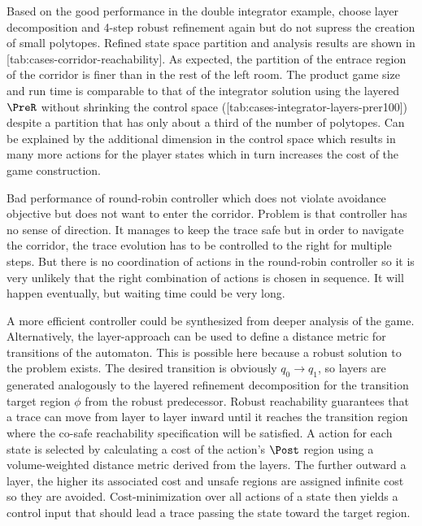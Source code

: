     Based on the good performance in the double integrator example, choose layer decomposition and 4-step robust refinement again but do not supress the creation of small polytopes.
    Refined state space partition and analysis results are shown in [tab:cases-corridor-reachability].
    As expected, the partition of the entrace region of the corridor is finer than in the rest of the left room.
    The product game size and run time is comparable to that of the integrator solution using the layered $\PreR$ without shrinking the control space ([tab:cases-integrator-layers-prer100]) despite a partition that has only about a third of the number of polytopes.
    Can be explained by the additional dimension in the control space which results in many more actions for the player states which in turn increases the cost of the game construction.

\stopsubsection


\startsubsection[title={Reachability Controller}]


    Bad performance of round-robin controller which does not violate avoidance objective but does not want to enter the corridor.
    Problem is that controller has no sense of direction.
    It manages to keep the trace safe but in order to navigate the corridor, the trace evolution has to be controlled to the right for multiple steps.
    But there is no coordination of actions in the round-robin controller so it is very unlikely that the right combination of actions is chosen in sequence.
    It will happen eventually, but waiting time could be very long.

    A more efficient controller could be synthesized from deeper analysis of the game.
    Alternatively, the layer-approach can be used to define a distance metric for transitions of the automaton.
    This is possible here because a robust solution to the problem exists.
    The desired transition is obviously $q_0 \rightarrow q_1$, so layers are generated analogously to the layered refinement decomposition for the transition target region $\phi$ from the robust predecessor.
    Robust reachability guarantees that a trace can move from layer to layer inward until it reaches the transition region where the co-safe reachability specification will be satisfied.
    A action for each state is selected by calculating a cost of the action's $\Post$ region using a volume-weighted distance metric derived from the layers.
    The further outward a layer, the higher its associated cost and unsafe regions are assigned infinite cost so they are avoided.
    Cost-minimization over all actions of a state then yields a control input that should lead a trace passing the state toward the target region.

